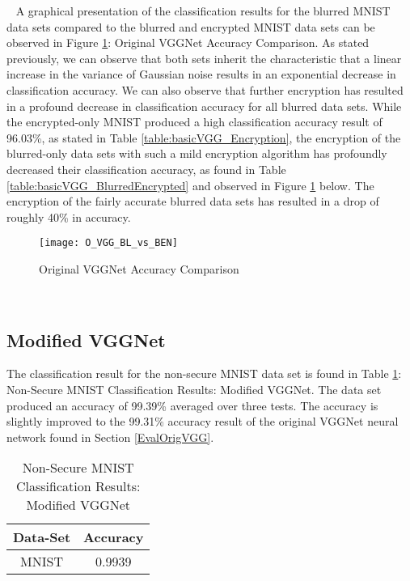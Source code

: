 \documentclass[12pt, titlepage]{article}
\begin{document}
~\newpage
\noindent A graphical presentation of the classification results for the blurred MNIST data sets compared to the blurred and encrypted MNIST data sets can be observed in Figure \ref{GRAPH_OriginalVGG}: Original VGGNet Accuracy Comparison. As stated previously, we can observe that both sets inherit the characteristic that a linear increase in the variance of Gaussian noise results in an exponential decrease in classification accuracy. We can also observe that further encryption has resulted in a profound decrease in classification accuracy for all blurred data sets. While the encrypted-only MNIST produced a high classification accuracy result of 96.03\%, as stated in Table \ref{table:basicVGG_Encryption}, the encryption of the blurred-only data sets with such a mild encryption algorithm has profoundly decreased their classification accuracy, as found in Table \ref{table:basicVGG_BlurredEncrypted} and observed in Figure \ref{GRAPH_OriginalVGG} below. The encryption of the fairly accurate blurred data sets has resulted in a drop of roughly 40\% in accuracy.


\begin{figure}[h!]
	\begin{center}
		\texttt{[image: O\_VGG\_BL\_vs\_BEN]}
		\caption{Original VGGNet Accuracy Comparison}
		\label{GRAPH_OriginalVGG}
	\end{center}
\end{figure} 

~\newpage
\subsection{Modified VGGNet}\label{EvalModVGG}

The classification result for the non-secure MNIST data set is found in Table \ref{table:modVGG_MNIST}: Non-Secure MNIST Classification Results: Modified VGGNet. The data set produced an accuracy of 99.39\% averaged over three tests. The accuracy is slightly improved to the 99.31\% accuracy result of the original VGGNet neural network found in Section \ref{EvalOrigVGG}.\\ 

\begin{table}[!h]
	\begin{center}
		\begin{tabular}{| c | c |}
			\hline
			\textbf{Data-Set} & \textbf{Accuracy}\\
			\hline
			MNIST & 0.9939\\
			\hline
		\end{tabular}
		\caption{Non-Secure MNIST Classification Results: Modified VGGNet}
		\label{table:modVGG_MNIST}
	\end{center}
\end{table}
\end{document}
